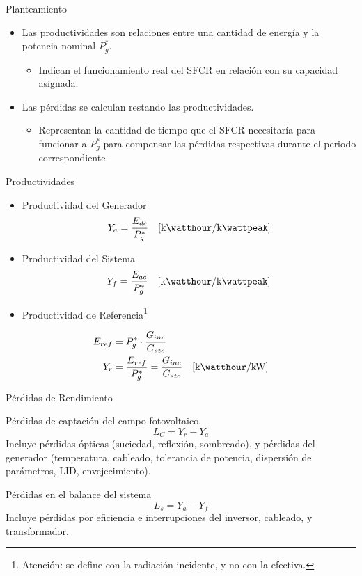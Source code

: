 \documentclass[aspectratio=169, usenames,svgnames,dvipsnames]{beamer}
\begin{document}
\begin{frame}[label={sec:org4e5e1ee}]{Planteamiento}
\begin{itemize}
\item Las \alert{productividades} son relaciones entre una cantidad de energía y la potencia nominal \(P_g^*\).
\begin{itemize}
\item Indican el funcionamiento real del SFCR en relación con su capacidad asignada.
\end{itemize}
\item Las \alert{pérdidas} se calculan restando las productividades.
\begin{itemize}
\item Representan la cantidad de tiempo que el SFCR necesitaría para funcionar a \(P_g^*\) para compensar las pérdidas respectivas durante el periodo correspondiente.
\end{itemize}
\end{itemize}
\end{frame}
\begin{frame}[label={sec:org23b5b3c}]{Productividades}
\begin{itemize}
\item Productividad del Generador 
\[
  Y_a = \frac{E_{dc}}{P_g^*} \quad [\unit{\kilo\watthour\per\kilo\wattpeak}]
\]

\item Productividad del Sistema
\[
  Y_f = \frac{E_{ac}}{P_g^*} \quad [\unit{\kilo\watthour\per\kilo\wattpeak}]
\]

\item Productividad de Referencia\footnote{Atención: se define con la radiación incidente, y no con la efectiva.}
\end{itemize}
\begin{align*}
  E_{ref} &= P_g^* \cdot \frac{G_{inc}}{G_{stc}}\\
  Y_r &= \frac{E_{ref}}{P_g^*} = \frac{G_{inc}}{G_{stc}} \quad [\unit{\kilo\watthour\per\kilo\watt}]
\end{align*}
\end{frame}
\begin{frame}[label={sec:org641d724}]{Pérdidas de Rendimiento}
\begin{block}{Pérdidas de captación del campo fotovoltaico.}
\[
  L_C = Y_r - Y_a
\]
Incluye pérdidas ópticas (suciedad, reflexión, sombreado), y pérdidas del generador (temperatura, cableado, tolerancia de potencia, dispersión de parámetros, LID, envejecimiento).
\end{block}

\begin{block}{Pérdidas en el balance del sistema}
\[
  L_s = Y_a - Y_f
\]
Incluye pérdidas por eficiencia e interrupciones del inversor, cableado,  y transformador.
\end{block}
\end{frame}
\end{document}
